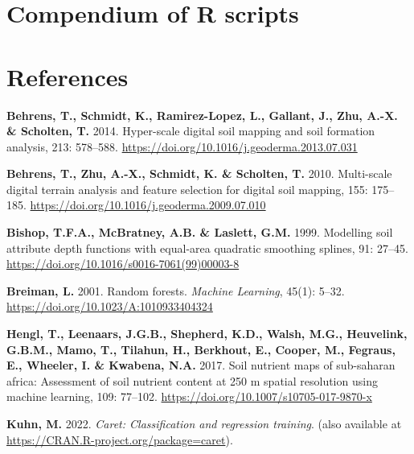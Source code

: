 \documentclass[
  10pt,
  b5paper,
  oneside]{book}
\newlength{\cslhangindent}
\newlength{\cslentryspacingunit} %
\newenvironment{CSLReferences}[2] %
 {%
  \setlength{\parindent}{0pt}
  \ifodd #1
  \let\oldpar\par
  \def\par{\hangindent=\cslhangindent\oldpar}
  \fi
  \setlength{\parskip}{#2\cslentryspacingunit}
 }%
 {}
\begin{document}
\hypertarget{compendium-of-r-scripts}{%
\chapter{Compendium of R scripts}\label{compendium-of-r-scripts}}

\hypertarget{references}{%
\chapter*{References}\label{references}}

\hypertarget{refs}{}
\begin{CSLReferences}{0}{0}
\leavevmode{}%
\textbf{Behrens, T., Schmidt, K., Ramirez-Lopez, L., Gallant, J., Zhu, A.-X. \& Scholten, T.} 2014. Hyper-scale digital soil mapping and soil formation analysis, 213: 578--588. \url{https://doi.org/10.1016/j.geoderma.2013.07.031}

\leavevmode{}%
\textbf{Behrens, T., Zhu, A.-X., Schmidt, K. \& Scholten, T.} 2010. Multi-scale digital terrain analysis and feature selection for digital soil mapping, 155: 175--185. \url{https://doi.org/10.1016/j.geoderma.2009.07.010}

\leavevmode{}%
\textbf{Bishop, T.F.A., McBratney, A.B. \& Laslett, G.M.} 1999. Modelling soil attribute depth functions with equal-area quadratic smoothing splines, 91: 27--45. \url{https://doi.org/10.1016/s0016-7061(99)00003-8}

\leavevmode{}%
\textbf{Breiman, L.} 2001. Random forests. \emph{Machine Learning}, 45(1): 5--32. \url{https://doi.org/10.1023/A:1010933404324}

\leavevmode{}%
\textbf{Hengl, T., Leenaars, J.G.B., Shepherd, K.D., Walsh, M.G., Heuvelink, G.B.M., Mamo, T., Tilahun, H., Berkhout, E., Cooper, M., Fegraus, E., Wheeler, I. \& Kwabena, N.A.} 2017. Soil nutrient maps of sub-saharan africa: Assessment of soil nutrient content at 250 m spatial resolution using machine learning, 109: 77--102. \url{https://doi.org/10.1007/s10705-017-9870-x}

\leavevmode{}%
\textbf{Kuhn, M.} 2022. \emph{Caret: Classification and regression training}. (also available at \url{https://CRAN.R-project.org/package=caret}).


\end{CSLReferences}
\end{document}
